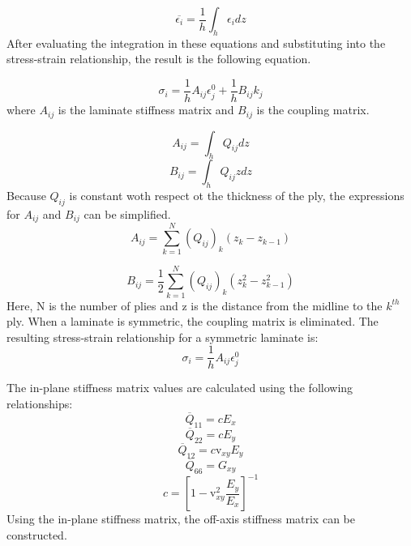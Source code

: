 \begin{equation}
    \overline{\epsilon_{i}} = \frac{1}{h} \int_h \epsilon_i dz
\end{equation}
After evaluating the integration in these equations and substituting into the stress-strain relationship, the result is the following equation.

\begin{equation}
    \sigma_i = \frac{1}{h} A_{ij} \epsilon_{j}^{0} + \frac{1}{h} B_{ij} k_j
\end{equation}
where $A_{ij}$ is the laminate stiffness matrix and $B_{ij}$ is the coupling matrix.

\begin{equation}
    A_{ij} = \int_h Q_{ij}dz
\end{equation}
\begin{equation}
    B_{ij} = \int_h Q_{ij} z dz
\end{equation}
Because $Q_{ij}$ is constant woth respect ot the thickness of the ply, the expressions for $A_{ij}$ and $B_{ij}$ can be simplified.
\begin{equation}\label{eqn:15}
    A_{ij} = \sum_{k=1}^{N} (Q_{ij})_{k} (z_k - z_{k-1})
\end{equation}

\begin{equation}
    B_{ij} = \frac{1}{2} \sum_{k=1}^{N} (Q_{ij})_{k} (z_k^2 - z_{k-1}^2)
\end{equation}
Here, N is the number of plies and z is the distance from the midline to the $k^{th}$ ply. When a laminate is symmetric, the coupling matrix is eliminated. The resulting stress-strain relationship for a symmetric laminate is:
\begin{equation}
    \sigma_i = \frac{1}{h} A_{ij} \epsilon_{j}^{0}
\end{equation}

The in-plane stiffness matrix values are calculated using the following relationships:
\begin{equation} \label{eqn:18}
    \overline{Q}_{11} = cE_x
\end{equation}
\begin{equation}
    \overline{Q}_{22} = cE_y
\end{equation}
\begin{equation}
    \overline{Q}_{12} = c \mbox{v}_{xy} E_y
\end{equation}
\begin{equation}
    \overline{Q}_{66} = G_{xy}
\end{equation}
\begin{equation}\label{eqn:22}
    c = \left [1-\mbox{v}_{xy}^2 \frac{E_y}{E_x} \right]^{-1}
\end{equation}
Using the in-plane stiffness matrix, the off-axis stiffness matrix can be constructed.

